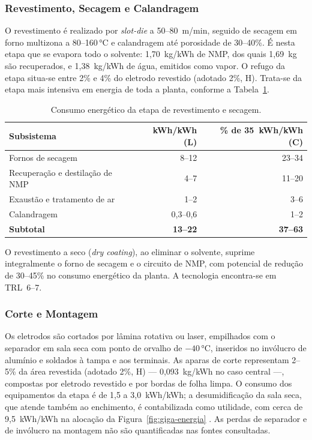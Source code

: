 \subsubsection{Revestimento, Secagem e Calandragem}

O revestimento é realizado por \textit{slot-die} a 50--80~m/min, seguido de
secagem em forno multizona a 80--160\,°C e calandragem até porosidade de
30--40\%. É nesta etapa que se evapora todo o solvente: 1,70~kg/kWh de NMP, dos
quais 1,69~kg são recuperados, e 1,38~kg/kWh de água, emitidos como vapor. O
refugo da etapa situa-se entre 2\% e 4\% do eletrodo revestido (adotado 2\%, H).
Trata-se da etapa mais intensiva em energia de toda a planta, conforme a
Tabela~\ref{tab:giga-energia-coating}.

\begin{table}[H]
\centering
\caption{Consumo energético da etapa de revestimento e secagem.}
\label{tab:giga-energia-coating}
\small
\renewcommand{\arraystretch}{1.15}
\begin{tabular}{@{} l r r @{}}
\toprule
\textbf{Subsistema} & \textbf{kWh/kWh (L)} & \textbf{\% de 35~kWh/kWh (C)} \\
\midrule
Fornos de secagem & 8--12 & 23--34 \\
Recuperação e destilação de NMP & 4--7 & 11--20 \\
Exaustão e tratamento de ar & 1--2 & 3--6 \\
Calandragem & 0,3--0,6 & 1--2 \\
\midrule
\textbf{Subtotal} & \textbf{13--22} & \textbf{37--63} \\
\bottomrule
\end{tabular}
\end{table}

O revestimento a seco (\textit{dry coating}), ao eliminar o solvente, suprime
integralmente o forno de secagem e o circuito de NMP, com potencial de redução de
30--45\% no consumo energético da planta. A tecnologia encontra-se em TRL~6--7.

\subsubsection{Corte e Montagem}

Os eletrodos são cortados por lâmina rotativa ou laser, empilhados com o separador
em sala seca com ponto de orvalho de $-40$\,°C, inseridos no invólucro de alumínio
e soldados à tampa e aos terminais. As aparas de corte representam 2--5\% da área
revestida (adotado 2\%, H) — 0,093~kg/kWh no caso central —, compostas por eletrodo
revestido e por bordas de folha limpa. O consumo dos equipamentos da etapa é de
1,5 a 3,0~kWh/kWh; a desumidificação da sala seca, que atende também ao
enchimento, é contabilizada como utilidade, com cerca de 9,5~kWh/kWh na alocação
da Figura~\ref{fig:giga-energia} . As perdas de separador e de
invólucro na montagem não são quantificadas nas fontes consultadas.

